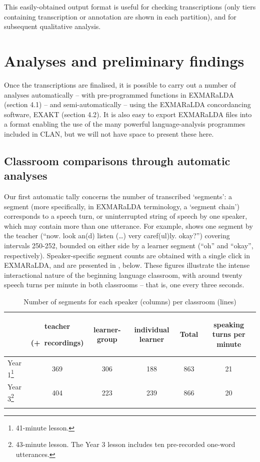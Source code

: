\documentclass[output=paper,colorlinks,citecolor=brown,modfonts,nonflat]{../langscibook}
\begin{document}
This easily-obtained output format is useful for checking transcriptions (only tiers containing transcription or annotation are shown in each partition), and for subsequent qualitative analysis.

\section{Analyses and preliminary findings} \label{sec:hilton:4}

Once the transcriptions are finalised, it is possible to carry out a number of analyses automatically – with pre-programmed functions in EXMARaLDA (section 4.1) – and semi-automatically – using the EXMARaLDA concordancing software, EXAKT (section 4.2). It is also easy to export EXMARaLDA files into a format enabling the use of the many powerful language-analysis programmes included in CLAN, but we will not have space to present these here.

\subsection{Classroom comparisons through automatic analyses} 

Our first automatic tally concerns the number of transcribed ‘segments’: a segment (more specifically,  in EXMARaLDA terminology, a ‘segment chain’) corresponds to a speech turn, or uninterrupted string of speech by one speaker, which may contain more than one utterance. For example,  shows one segment by the teacher (“now. look an(d) listen (…) very caref(ul)ly. okay?”) covering intervals 250-252, bounded on either side by a learner segment (“oh” and “okay”, respectively). Speaker-specific segment counts are obtained with a single click in EXMARaLDA, and are presented in , below. These figures illustrate the intense interactional nature of the beginning language classroom, with around twenty speech turns per minute in both classrooms – that is, one every three seconds.

\begin{table}
\caption{Number of segments for each speaker (columns) per classroom (lines)\label{tab:hilton:2}}
\small
\begin{tabularx}{\textwidth}{QCCCCC}
\lsptoprule
& {\raggedright teacher}\newline\raggedright(+~recordings) & learner-group & individual learner & Total & speaking turns per minute\\
 \midrule
Year 1\footnote{41-minute  lesson.} & 369 & 306 & 188 & 863 & 21\\
Year 3\footnote{43-minute  lesson. The Year 3 lesson includes ten pre-recorded one-word utterances.} & 404 & 223 & 239 & 866 & 20\\
\lspbottomrule
\end{tabularx}
\end{table}
\end{document}
